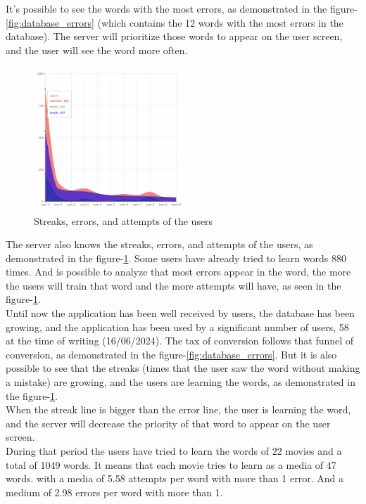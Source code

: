 \documentclass[12pt]{article}
\begin{document}
It's possible to see the words with the most errors, as demonstrated in the figure-\ref{fig:database_errors} (which contains the 12 words with the most errors in the database). The server will prioritize those words to appear on the user screen, and the user will see the word more often. 
\begin{figure}[!h]
  \centering
  \caption{
  Streaks, errors, and attempts of the users
  }
  \label{fig:database_users}
  \includegraphics[width=0.50\textwidth]{assets/31.png}
\end{figure}
The server also knows the streaks, errors, and attempts of the users, as demonstrated in the figure-\ref{fig:database_users}. Some users have already tried to learn words 880 times. And is possible to analyze that 
most errors appear in the word, the more the users will train that word and the more attempts will have, as seen in the figure-\ref{fig:database_users}. \\
Until now the application has been well received by users, the database has been growing, and the application has been used by a significant number of users, 58 at the time of writing (16/06/2024). The tax of conversion follows that funnel of conversion, as demonstrated in the figure-\ref{fig:database_errors}. 
But it is also possible to see that the streaks (times that the user saw the word without making a mistake) are growing, and the users are learning the words, as demonstrated in the figure-\ref{fig:database_users}. \\
When the streak line is bigger than the error line, the user is learning the word, and the server will decrease the priority of that word to appear on the user screen. \\
During that period the users have tried to learn the words of 22 movies and a total of 1049 words. It means that each movie tries to learn as a media of 47 words. with a media of 5.58 attempts per word with more than 1 error. And a medium of 2.98 errors per word with more than 1. \\
\end{document}

